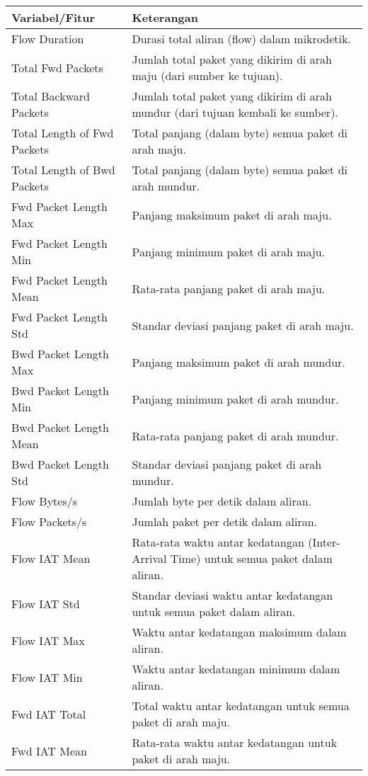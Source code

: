 \documentclass[a4paper,12pt]{report}
\begin{document}
\newpage
\begin{table}[h!]
	\centering
	\begin{longtable}{|p{3cm}| p{10cm}|}
		\hline
		Variabel/Fitur & Keterangan \\
		\hline
		Flow Duration & Durasi total aliran (flow) dalam mikrodetik. \\
		\hline
		Total Fwd Packets & Jumlah total paket yang dikirim di arah maju (dari sumber ke tujuan). \\
		\hline
		Total Backward Packets & Jumlah total paket yang dikirim di arah mundur (dari tujuan kembali ke sumber). \\
		\hline
		Total Length of Fwd Packets & Total panjang (dalam byte) semua paket di arah maju. \\
		\hline
		Total Length of Bwd Packets & Total panjang (dalam byte) semua paket di arah mundur. \\
		\hline
		Fwd Packet Length Max & Panjang maksimum paket di arah maju. \\
		\hline
		Fwd Packet Length Min & Panjang minimum paket di arah maju. \\
		\hline
		Fwd Packet Length Mean & Rata-rata panjang paket di arah maju. \\
		\hline
		Fwd Packet Length Std & Standar deviasi panjang paket di arah maju. \\
		
		Bwd Packet Length Max & Panjang maksimum paket di arah mundur. \\
		\hline
		Bwd Packet Length Min & Panjang minimum paket di arah mundur. \\
		\hline
		Bwd Packet Length Mean & Rata-rata panjang paket di arah mundur. \\
		\hline
		Bwd Packet Length Std & Standar deviasi panjang paket di arah mundur. \\
		\hline
		Flow Bytes/s & Jumlah byte per detik dalam aliran. \\
		\hline
		Flow Packets/s & Jumlah paket per detik dalam aliran. \\
		\hline
		Flow IAT Mean & Rata-rata waktu antar kedatangan (Inter-Arrival Time) untuk semua paket dalam aliran. \\
		\hline
		Flow IAT Std & Standar deviasi waktu antar kedatangan untuk semua paket dalam aliran. \\
		\hline
		Flow IAT Max & Waktu antar kedatangan maksimum dalam aliran. \\
		\hline
		Flow IAT Min & Waktu antar kedatangan minimum dalam aliran. \\
		\hline
		Fwd IAT Total & Total waktu antar kedatangan untuk semua paket di arah maju. \\
		\hline
		Fwd IAT Mean & Rata-rata waktu antar kedatangan untuk paket di arah maju. \\
		\hline
	\end{longtable}
\end{table}
\newpage
\end{document}
